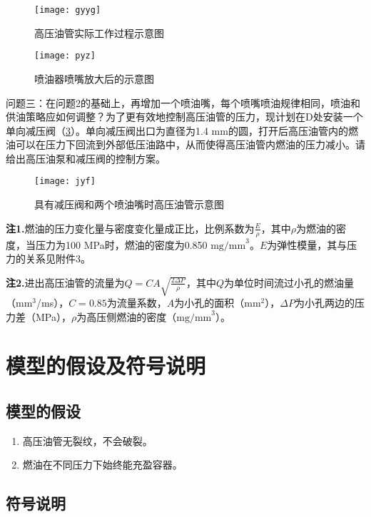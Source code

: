 \documentclass[withoutpreface,bwprint]{cumcmthesis} %
\begin{document}
\begin{figure}[!h]
	\centering
	\texttt{[image: gyyg]}
	\caption{高压油管实际工作过程示意图}
	\label{fig:gyyg}
\end{figure}

\begin{figure}[!h]
	\centering
	\texttt{[image: pyz]}
	\caption{喷油器喷嘴放大后的示意图}
	\label{fig:pyz}
\end{figure}


问题三：在问题2的基础上，再增加一个喷油嘴，每个喷嘴喷油规律相同，喷油和供油策略应如何调整？为了更有效地控制高压油管的压力，现计划在D处安装一个单向减压阀（\cref{fig:jyf}）。单向减压阀出口为直径为1.4 mm的圆，打开后高压油管内的燃油可以在压力下回流到外部低压油路中，从而使得高压油管内燃油的压力减小。请给出高压油泵和减压阀的控制方案。

\begin{figure}[!h]
	\centering
	\texttt{[image: jyf]}
	\caption{具有减压阀和两个喷油嘴时高压油管示意图}
	\label{fig:jyf}
\end{figure}

\textbf{注1.}燃油的压力变化量与密度变化量成正比，比例系数为$\frac{E}{\rho}$，其中$\rho$为燃油的密度，当压力为100 MPa时，燃油的密度为0.850 $\text{mg/mm}^{3}$。$E$为弹性模量，其与压力的关系见附件3。

\textbf{注2.}进出高压油管的流量为$Q=CA\sqrt{\frac{2\Delta P}{\rho}}$，其中$Q$为单位时间流过小孔的燃油量（mm$^{3}$/ms），$C=0.85$为流量系数，$A$为小孔的面积（mm$^{2}$），$\Delta P$为小孔两边的压力差（MPa），$\rho$为高压侧燃油的密度（$\text{mg/mm}^{3}$）。


\section{模型的假设及符号说明}
\subsection{模型的假设}
\begin{enumerate}
	\item 高压油管无裂纹，不会破裂。
	\item 燃油在不同压力下始终能充盈容器。
\end{enumerate}

\subsection{符号说明}
\end{document}

